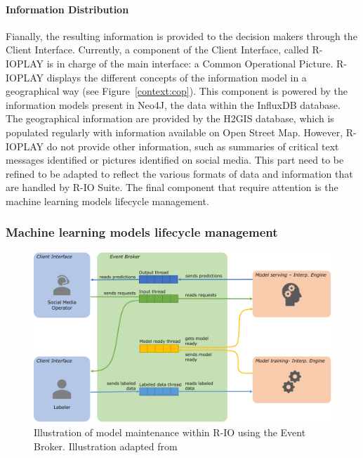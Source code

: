 \paragraph{Information Distribution}
Fianally, the resulting information is provided to the decision makers through the Client Interface.
Currently, a component of the Client Interface, called R-IOPLAY is in charge of the main interface: a Common Operational Picture.
R-IOPLAY displays the different concepts of the information model in a geographical way (see Figure~\ref{context:cop}).
This component is powered by the information models present in Neo4J, the data within the InfluxDB database.
The geographical information are provided by the H2GIS database, which is populated regularly with information available on Open Street Map.
However, R-IOPLAY do not provide other information, such as summaries of critical text messages identified or pictures identified on social media.
This part need to be refined to be adapted to reflect the various formats of data and information that are handled by R-IO Suite.
The final component that require attention is the machine learning models lifecycle management.

\subsubsection{Machine learning models lifecycle management}
\begin{figure}[htb]
    \centering
    \includegraphics[width=\textwidth]{figures/chap-5/rio-ml-lifecycle.pdf}
    \caption{Illustration of model maintenance within R-IO using the Event Broker. Illustration adapted from \textcite{burkovMachineLearningEngineering2020}}
    \label{system:rio-broker-ml-lifecycle}
\end{figure}

